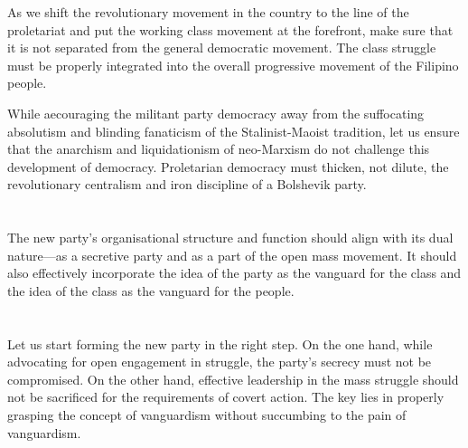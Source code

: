 As we shift the revolutionary movement in the country 
to the line of the proletariat and put the working class movement 
at the forefront, 
make sure that it is not separated 
from the general democratic movement. 
The class struggle must be properly integrated 
into the overall progressive movement of the Filipino people.

While aecouraging the militant party democracy away
from the suffocating absolutism and blinding fanaticism 
of the Stalinist-Maoist tradition, 
let us ensure that the anarchism and liquidationism 
of neo-Marxism do not challenge this development of democracy. 
Proletarian democracy must thicken, not dilute, the revolutionary centralism 
and iron discipline of a Bolshevik party.

\section{}
The new party's organisational structure and function
should align with its dual nature---as 
a secretive party and as 
a part of the open mass movement. 
It should also effectively incorporate 
the idea of the party 
as the vanguard for the class and 
the idea of the class as the vanguard for the people.

\section{}
Let us start forming the new party in the right step. 
On the one hand,
while advocating for open engagement in struggle, 
the party's secrecy must not be compromised.
On the other hand, 
effective leadership in the mass struggle should not be sacrificed 
for the requirements of covert action. 
The key lies in properly grasping the concept of vanguardism 
without succumbing to the pain of vanguardism.